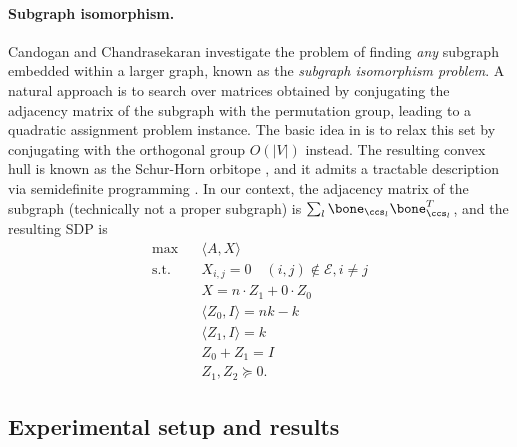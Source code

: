 \paragraph{Subgraph isomorphism.}  Candogan and Chandrasekaran \cite{CC:18} investigate the problem of finding {\em any} subgraph embedded within a larger graph, known as the {\em subgraph isomorphism problem}.  A natural approach is to search over matrices obtained by conjugating the adjacency matrix of the subgraph with the permutation group, leading to a quadratic assignment problem instance.  The basic idea in \cite{CC:18} is to relax this set by conjugating with the orthogonal group $O(|V|)$ instead.  The resulting convex hull is known as the Schur-Horn orbitope \cite{SSS:11}, and it admits a tractable description via semidefinite programming \cite{DW:09}.  In our context, the adjacency matrix of the subgraph (technically not a proper subgraph) is $\sum_{l} \bone_{\ccs_l} \bone_{\ccs_l}^T$, and the resulting SDP is
\begin{equation} \label{eq:sh}
\begin{aligned}
\max ~~ & ~~ \langle A, X \rangle \\
\mathrm{s.t.} ~~ & ~~ X_{i,j} = 0 \quad (i,j) \notin \mathcal{E}, i \neq j \\
& ~~ X = n \cdot Z_1 + 0 \cdot Z_0 \\
& ~~ \langle Z_0, I \rangle = nk-k \\
& ~~ \langle Z_1, I \rangle = k \\
& ~~ Z_0 + Z_1 = I \\
& ~~ Z_1, Z_2 \succeq 0.
\end{aligned}
\end{equation}



\subsection{Experimental setup and results}



